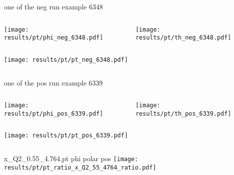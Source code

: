 \begin{frame}{one of the neg run example 6348}
\begin{columns}
\begin{column}[T]{0.5\textwidth}
\texttt{[image: results/pt/phi\_neg\_6348.pdf]}
\end{column}
\begin{column}[T]{0.5\textwidth}
\texttt{[image: results/pt/th\_neg\_6348.pdf]}
\end{column}
\end{columns}
\begin{columns}
\begin{column}[T]{0.5\textwidth}
\texttt{[image: results/pt/pt\_neg\_6348.pdf]}
\end{column}
\begin{column}[T]{0.5\textwidth}
\end{column}
\end{columns}
\end{frame}
\begin{frame}{one of the pos run example 6339}
\begin{columns}
\begin{column}[T]{0.5\textwidth}
\texttt{[image: results/pt/phi\_pos\_6339.pdf]}
\end{column}
\begin{column}[T]{0.5\textwidth}
\texttt{[image: results/pt/th\_pos\_6339.pdf]}
\end{column}
\end{columns}
\begin{columns}
\begin{column}[T]{0.5\textwidth}
\texttt{[image: results/pt/pt\_pos\_6339.pdf]}
\end{column}
\begin{column}[T]{0.5\textwidth}
\end{column}
\end{columns}
\end{frame}
\begin{frame}{x\_Q2\_0.55\_4.764,pt phi polar pos}
\texttt{[image: results/pt/pt\_ratio\_x\_Q2\_55\_4764\_ratio.pdf]}
\end{frame}
